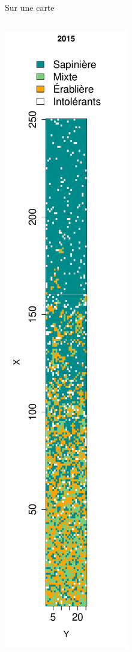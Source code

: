 \documentclass{eecslides}
\begin{document}

	\begin{frame}{Sur une carte}
		\begin{columns}
			\begin{column}{0.25\textwidth}
				\begin{center}
					\includegraphics[height=0.8\textheight]{largeplot_2015}

\end{center}
\end{column}
\end{columns}
\end{frame}
\end{document}
